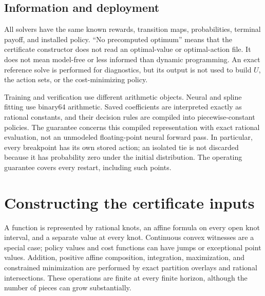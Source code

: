 \subsection{Information and deployment}
All solvers have the same known rewards, transition maps, probabilities, terminal payoff, and installed policy. ``No precomputed optimum'' means that the certificate constructor does not read an optimal-value or optimal-action file. It does not mean model-free or less informed than dynamic programming. An exact reference solve is performed for diagnostics, but its output is not used to build $U$, the action sets, or the cost-minimizing policy.

Training and verification use different arithmetic objects. Neural and spline fitting use binary64 arithmetic. Saved coefficients are interpreted exactly as rational constants, and their decision rules are compiled into piecewise-constant policies. The guarantee concerns this compiled representation with exact rational evaluation, not an unmodeled floating-point neural forward pass. In particular, every breakpoint has its own stored action; an isolated tie is not discarded because it has probability zero under the initial distribution. The operating guarantee covers every restart, including such points.

\section{Constructing the certificate inputs}\label{sec:construction}
A function is represented by rational knots, an affine formula on every open knot interval, and a separate value at every knot. Continuous convex witnesses are a special case; policy values and cost functions can have jumps or exceptional point values. Addition, positive affine composition, integration, maximization, and constrained minimization are performed by exact partition overlays and rational intersections. These operations are finite at every finite horizon, although the number of pieces can grow substantially.

